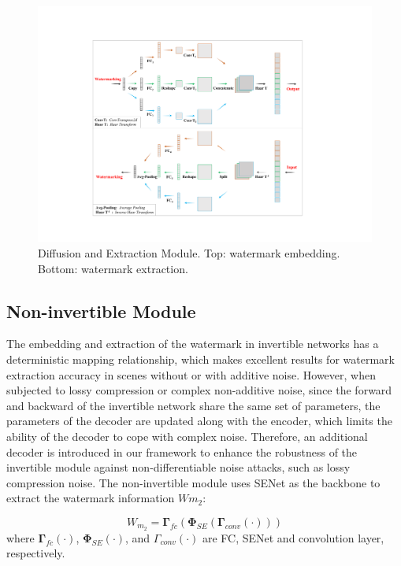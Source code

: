 \documentclass[sigconf]{acmart}
\begin{document}
\begin{figure}[t]
	\centering
	\includegraphics[width=1.0\linewidth]{picture/diffusion_module.pdf}
	\caption{Diffusion and Extraction Module. Top: watermark embedding. Bottom: watermark extraction.}
	\label{fig:diffusion_module}
\end{figure}









\subsection{Non-invertible Module}

The embedding and extraction of the watermark in invertible networks has a deterministic mapping relationship, which makes excellent results for watermark extraction accuracy in scenes without or with additive noise. However, when subjected to lossy compression or complex non-additive noise, since the forward and backward of the invertible network share the same set of parameters, the parameters of the decoder are updated along with the encoder, which limits the ability of the decoder to cope with complex noise. Therefore, an additional decoder is introduced in our framework to enhance the robustness of the invertible module against non-differentiable noise attacks, such as lossy compression noise. 
The non-invertible module uses SENet as the backbone to extract the watermark information $Wm_{2}$:

\begin{equation}
   W_{m_{2}}=\mathbf{\Gamma}_{fc}(\mathbf{\Phi}_{SE}(\mathbf{\Gamma}_{conv}(\cdot)))
\end{equation}
where $\mathbf{\Gamma}_{fc}(\cdot)$, $\mathbf{\Phi}_{SE}(\cdot)$, and ${\Gamma}_{conv}(\cdot)$ are FC, SENet and convolution layer, respectively.
\end{document}
